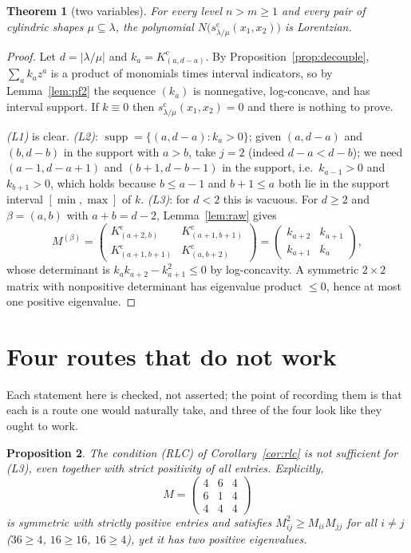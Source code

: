 \documentclass[11pt]{article}
\newtheorem{theorem}{Theorem}
\newtheorem{proposition}[theorem]{Proposition}
\theoremstyle{definition}
\DeclareMathOperator{\supp}{supp}
\newcommand{\scy}{s^{\mathrm{c}}}
\newcommand{\Kc}{K^{\mathrm{c}}}
\begin{document}
\begin{theorem}[two variables]\label{thm:ell2}
For every level $n>m\ge1$ and every pair of cylindric shapes $\mu\subseteq\lambda$,
the polynomial $N\big(\scy_{\lambda/\mu}(x_1,x_2)\big)$ is Lorentzian.
\end{theorem}

\begin{proof}
Let $d=|\lambda/\mu|$ and $k_a=\Kc_{(a,d-a)}$. By Proposition~\ref{prop:decouple},
$\sum_ak_az^a$ is a product of monomials times interval indicators, so by
Lemma~\ref{lem:pf2} the sequence $(k_a)$ is nonnegative, log-concave, and has interval support.
If $k\equiv0$ then $\scy_{\lambda/\mu}(x_1,x_2)=0$ and there is nothing to prove.

\emph{(L1)} is clear. \emph{(L2)}: $\supp=\{(a,d-a):k_a>0\}$; given $(a,d-a)$ and $(b,d-b)$ in
the support with $a>b$, take $j=2$ (indeed $d-a<d-b$); we need $(a-1,d-a+1)$ and
$(b+1,d-b-1)$ in the support, i.e.\ $k_{a-1}>0$ and $k_{b+1}>0$, which holds because
$b\le a-1$ and $b+1\le a$ both lie in the support interval $[\min,\max]$ of $k$.
\emph{(L3)}: for $d<2$ this is vacuous. For $d\ge2$ and $\beta=(a,b)$ with $a+b=d-2$,
Lemma~\ref{lem:raw} gives
\[
  M^{(\beta)}=\begin{pmatrix}\Kc_{(a+2,b)}&\Kc_{(a+1,b+1)}\\
  \Kc_{(a+1,b+1)}&\Kc_{(a,b+2)}\end{pmatrix}
  =\begin{pmatrix}k_{a+2}&k_{a+1}\\ k_{a+1}&k_{a}\end{pmatrix},
\]
whose determinant is $k_ak_{a+2}-k_{a+1}^2\le0$ by log-concavity. A symmetric $2\times2$
matrix with nonpositive determinant has eigenvalue product $\le0$, hence at most one positive
eigenvalue.
\end{proof}

\section{Four routes that do not work}\label{sec:negative}

Each statement here is checked, not asserted; the point of recording them is that each is a
route one would naturally take, and three of the four look like they ought to work.

\begin{proposition}\label{prop:rlc-insufficient}
The condition (RLC) of Corollary~\ref{cor:rlc} is not sufficient for (L3), even together with
strict positivity of all entries. Explicitly,
\[
  M=\begin{pmatrix}4&6&4\\6&1&4\\4&4&4\end{pmatrix}
\]
is symmetric with strictly positive entries and satisfies $M_{ij}^2\ge M_{ii}M_{jj}$ for all
$i\ne j$ \emph{(}$36\ge4$, $16\ge16$, $16\ge4$\emph{)}, yet it has two positive eigenvalues.
\end{proposition}
\end{document}
